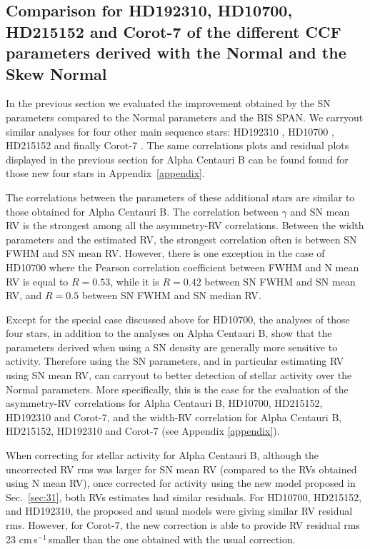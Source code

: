 \documentclass{aa}
\def\cms{\hbox{\,cm\,s$^{-1}$}}       %
\begin{document}
\subsection{Comparison for HD192310, HD10700, HD215152 and Corot-7 of the different CCF parameters derived with the Normal and the Skew Normal} \label{sec:real_data_other_stars}

In the previous section we evaluated the improvement obtained by the SN parameters compared to the Normal parameters and the BIS SPAN. We carryout similar analyses for four other main sequence stars: HD192310 \citep[K2V,][]{Pepe-2011}, HD10700 \citep[G8V,][]{Feng:2017ac}, HD215152 \citep[K3V,][]{Delisle:2018aa} and finally Corot-7 \citep[K0V,][]{Haywood-2014}. The same correlations plots and residual plots displayed in the previous section for Alpha Centauri B can be found found for those new four stars in Appendix~\ref{appendix}.

The correlations between the parameters of these additional stars are similar to those obtained for Alpha Centauri B. The correlation between $\gamma$ and SN mean RV is the strongest among all the asymmetry-RV correlations. 
%
Between the width parameters and the estimated RV, the strongest correlation often is between SN FWHM and SN mean RV. 
However, there is one exception in the case of HD10700 where the Pearson correlation coefficient between FWHM and N mean RV is equal to $R=0.53$, while it is $R=0.42$ between SN FWHM and SN mean RV, and $R=0.5$ between SN FWHM and SN median RV.

Except for the special case discussed above for HD10700, the analyses of those four stars, in addition to the analyses on Alpha Centauri B, show that the parameters derived when using a SN density are generally more sensitive to activity.  
Therefore using the SN parameters, and in particular estimating RV using SN mean RV, can carryout to better detection of stellar activity over the Normal parameters. 
More specifically, this is the case for the evaluation of the asymmetry-RV correlations for Alpha Centauri B, HD10700, HD215152, HD192310 and Corot-7, and the width-RV correlation for Alpha Centauri B, HD215152, HD192310 and Corot-7 (see Appendix \ref{appendix}).

When correcting for stellar activity for  Alpha Centauri B, although the uncorrected RV rms was larger for SN mean RV (compared to the RVs obtained using N mean RV), once corrected for activity using the new model proposed in Sec.~\ref{sec:31}, both RVs estimates had similar residuals. 
For HD10700, HD215152, and HD192310, the proposed and usual models were giving similar RV residual rms.
However, for Corot-7, the new correction is able to provide RV residual rms 23\,\cms\,smaller than the one obtained with the usual correction.
\end{document}
